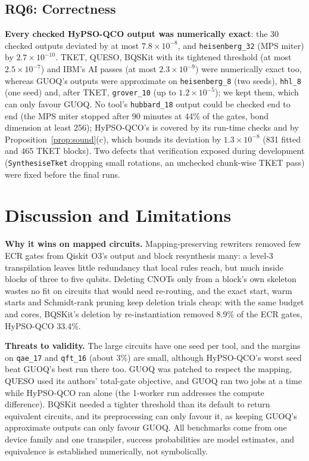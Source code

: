 \documentclass[conference,letterpaper]{IEEEtran}
\newcommand{\cir}[1]{\texttt{#1}}
\newcommand{\tool}[1]{\texttt{#1}}
\newcommand{\hypso}{HyPSO-QCO}
\begin{document}
\subsection{RQ6: Correctness}
\textbf{Every checked \hypso{} output was numerically exact}: the 30 checked outputs deviated by at most
$7.8\times10^{-8}$, and \cir{heisenberg\_32} (MPS miter) by $2.7\times10^{-10}$. TKET, QUESO, BQSKit with its
tightened threshold (at most $2.5\times10^{-7}$) and IBM's AI passes (at most $2.3\times10^{-9}$) were
numerically exact too, whereas GUOQ's outputs were approximate on \cir{heisenberg\_8} (two seeds),
\cir{hhl\_8} (one seed) and, after TKET, \cir{grover\_10} (up to $1.2\times10^{-5}$); we kept them, which can
only favour GUOQ. No tool's \cir{hubbard\_18} output could be checked end to end (the MPS miter stopped after
90 minutes at 44\% of the gates, bond dimension at least 256); \hypso{}'s is covered by its run-time checks
and by Proposition~\ref{prop:sound}(c), which bounds its deviation by $1.3\times10^{-8}$ (831 fitted and 465
TKET blocks). Two defects that verification exposed during development (\tool{SynthesiseTket} dropping small
rotations, an unchecked chunk-wise TKET pass) were fixed before the final runs.

\section{Discussion and Limitations}
\textbf{Why it wins on mapped circuits.} Mapping-preserving rewriters removed few ECR gates from Qiskit O3's
output and block resynthesis many: a level-3 transpilation leaves little redundancy that local rules reach,
but much inside blocks of three to five qubits. Deleting CNOTs only from a block's own skeleton wastes no fit
on circuits that would need re-routing, and the exact start, warm starts and Schmidt-rank pruning keep
deletion trials cheap: with the same budget and cores, BQSKit's deletion by re-instantiation removed 8.9\% of
the ECR gates, \hypso{} 33.4\%.

\textbf{Threats to validity.} The large circuits have one seed per tool, and the margins on \cir{qae\_17} and
\cir{qft\_16} (about 3\%) are small, although \hypso{}'s worst seed beat GUOQ's best run there too. GUOQ was
patched to respect the mapping, QUESO used its authors' total-gate objective, and GUOQ ran two jobs at a time
while \hypso{} ran alone (the 1-worker run addresses the compute difference). BQSKit needed a tighter threshold
than its default to return equivalent circuits, and its preprocessing can only favour it, as keeping GUOQ's
approximate outputs can only favour GUOQ. All benchmarks come from one device family and one transpiler,
success probabilities are model estimates, and equivalence is established numerically, not symbolically.
\end{document}
